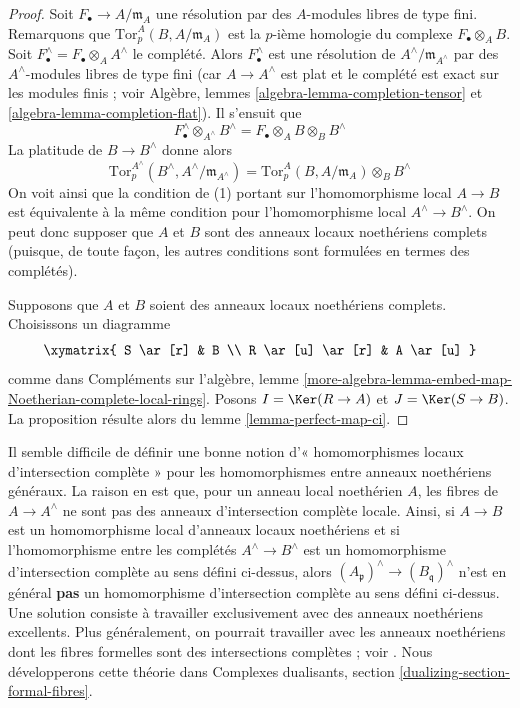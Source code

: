 \begin{proof}
Soit $F_\bullet \to A/\mathfrak m_A$ une résolution par des $A$-modules
libres de type fini. Remarquons que
$\text{Tor}^A_p(B, A/\mathfrak m_A)$
est la $p$-ième homologie du complexe $F_\bullet \otimes_A B$.
Soit $F_\bullet^\wedge = F_\bullet \otimes_A A^\wedge$ le complété.
Alors $F_\bullet^\wedge$ est une résolution de $A^\wedge/\mathfrak m_{A^\wedge}$
par des $A^\wedge$-modules libres de type fini (car $A \to A^\wedge$ est plat et le complété
est exact sur les modules finis ; voir
Algèbre, lemmes \ref{algebra-lemma-completion-tensor} et
\ref{algebra-lemma-completion-flat}).
Il s'ensuit que
$$
F_\bullet^\wedge \otimes_{A^\wedge} B^\wedge =
F_\bullet \otimes_A B \otimes_B B^\wedge
$$
La platitude de $B \to B^\wedge$ donne alors
$$
\text{Tor}^{A^\wedge}_p(B^\wedge, A^\wedge/\mathfrak m_{A^\wedge}) =
\text{Tor}^A_p(B, A/\mathfrak m_A) \otimes_B B^\wedge
$$
On voit ainsi que la condition de (1) portant sur l'homomorphisme local $A \to B$
est équivalente à la même condition pour l'homomorphisme local
$A^\wedge \to B^\wedge$.
On peut donc supposer que $A$ et $B$ sont des anneaux locaux noethériens complets
(puisque, de toute façon, les autres conditions sont formulées en termes des complétés).

\medskip\noindent
Supposons que $A$ et $B$ soient des anneaux locaux noethériens complets.
Choisissons un diagramme
$$
\xymatrix{
S \ar[r] & B \\
R \ar[u] \ar[r] & A \ar[u]
}
$$
comme dans Compléments sur l'algèbre, lemme
\ref{more-algebra-lemma-embed-map-Noetherian-complete-local-rings}.
Posons $I = \Ker(R \to A)$ et $J = \Ker(S \to B)$.
La proposition résulte alors du lemme \ref{lemma-perfect-map-ci}.
\end{proof}

\begin{remark}
\label{remark-no-good-ci-map}
Il semble difficile de définir une bonne notion d'« homomorphismes locaux
d'intersection complète » pour les homomorphismes entre anneaux noethériens généraux.
La raison en est que, pour un anneau local noethérien $A$, les fibres de
$A \to A^\wedge$ ne sont pas des anneaux d'intersection complète locale.
Ainsi, si $A \to B$ est un homomorphisme local d'anneaux locaux noethériens
et si l'homomorphisme entre les complétés $A^\wedge \to B^\wedge$ est un
homomorphisme d'intersection complète au sens défini ci-dessus,
alors $(A_\mathfrak p)^\wedge \to (B_\mathfrak q)^\wedge$ n'est en général
{\bf pas} un homomorphisme d'intersection complète au sens
défini ci-dessus. Une solution consiste à travailler exclusivement avec des
anneaux noethériens excellents. Plus généralement, on pourrait travailler avec
les anneaux noethériens dont les fibres formelles sont des
intersections complètes ; voir \cite{Rodicio-ci}.
Nous développerons cette théorie dans
Complexes dualisants, section \ref{dualizing-section-formal-fibres}.
\end{remark}

